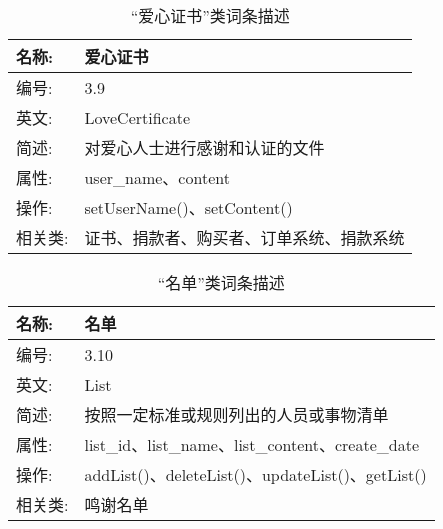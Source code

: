 \begin{table}[H]  
\caption{“爱心证书”类词条描述}  
\begin{center}  
    \begin{tabular}{l p{11cm}} 
        \hline
        \quad 名称:  &  爱心证书 \\
        \hline
        \quad 编号:  & 3.9 \\
        \hline
        \quad 英文:  &  LoveCertificate \\
        \hline
        \quad 简述:  & 对爱心人士进行感谢和认证的文件 \\
        \hline
        \quad 属性:  & user\_name、content\\
        \hline
        \quad 操作:  & setUserName()、setContent()\\
        \hline
        \quad 相关类:  & 证书、捐款者、购买者、订单系统、捐款系统 \\
        \hline
    \end{tabular}
\end{center}
\end{table}

\begin{table}[H]  
\caption{“名单”类词条描述}  
\begin{center}  
    \begin{tabular}{l p{11cm}} 
        \hline
        \quad 名称:  &  名单 \\
        \hline
        \quad 编号:  & 3.10 \\
        \hline
        \quad 英文:  &  List \\
        \hline
        \quad 简述:  & 按照一定标准或规则列出的人员或事物清单 \\
        \hline
        \quad 属性:  &list\_id、list\_name、list\_content、create\_date\\
        \hline
        \quad 操作:  & addList()、deleteList()、updateList()、getList() \\
        \hline
        \quad 相关类:  & 鸣谢名单 \\
        \hline
    \end{tabular}
\end{center}
\end{table}

